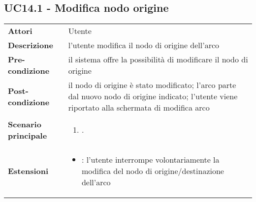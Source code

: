 \subsection{UC14.1 - Modifica nodo origine} 
\label{sssec:UC14.1} 
\def\arraystretch{1.5}
\begin{tabularx}{\textwidth}{l|p{}}
	\rowcolor{I} \multicolumn{2}{c}{\color{white}\textbf{UC14.1 - Modifica nodo origine}} \\
	\toprule
	\endhead
	\textbf{Attori} & Utente\\
	\textbf{Descrizione} & l'utente modifica il nodo di origine dell'arco\\
	\textbf{Pre-condizione} & il sistema offre la possibilità di modificare il nodo di origine\\
	\textbf{Post-condizione} & il nodo di origine è stato modificato; l'arco parte dal nuovo nodo di origine indicato; l'utente viene riportato alla schermata di modifica arco\\
	\textbf{Scenario principale} & \vspace{-1.2em}\begin{enumerate}[leftmargin=*,noitemsep,nosep]
		\item \nameref{sssec:UC14.1}.
	\end{enumerate}\\
	\textbf{Estensioni} & \vspace{-1.2em}\begin{itemize}[leftmargin=*,noitemsep,nosep]
		\item \nameref{sssec:UC14.3}: l'utente interrompe volontariamente la modifica del nodo di
		origine/destinazione dell'arco
	\end{itemize}\\
	\bottomrule
\end{tabularx}
